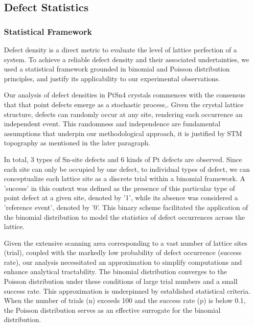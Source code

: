 \subsection{Defect Statistics}

\subsubsection{Statistical Framework}
Defect density is a direct metric to evaluate the level of lattice perfection of a system. To achieve a reliable defect density and their associated undertainties, we used a statistical framework grounded in binomial and Poisson distribution principles, and justify its applicability to our experimental observations.
\par Our analysis of defect densities in PtSn4 crystals commences with the consensus that that point defects emerge as a stochastic process\cite{rudolphDefectFormationCrystal2010},\cite{mosquera-loisImperfectionsAreNot2023}. Given the crystal lattice structure, defects can randomly occur at any site, rendering each occurrence an independent event. This randomness and independence are fundamental assumptions that underpin our methodological approach, it is justified by STM topography as mentioned in the later paragraph.  
\par In total, 3 types of Sn-site defects and 6 kinds of Pt defects are observed. Since each site can only be occupied by one defect, to individual types of defect, we can conceptualize each lattice site as a discrete trial within a binomial framework. A 'success' in this context was defined as the presence of this particular type of point defect at a given site, denoted by '1', while its absence was considered a 'reference event', denoted by '0'. This binary scheme facilitated the application of the binomial distribution to model the statistics of defect occurrences across the lattice.
\par Given the extensive scanning area corresponding to a vast number of lattice sites (trial), coupled with the markedly low probability of defect occurrence (success rate), our analysis necessitated an approximation to simplify computations and enhance analytical tractability. The 
binomial distribution converges to the Poisson distribution under these conditions of large trial numbers and a small success rate. This approximation is underpinned by established statistical criteria. When the number of trials (n) exceeds 100 and the success rate (p) is below 0.1, the Poisson distribution serves as an effective surrogate for the binomial distribution. 
